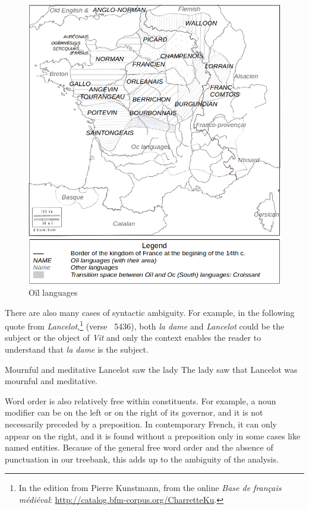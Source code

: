 \begin{figure}[thb]
    \centering
    \includegraphics[scale=0.29]{static/media/mod_eval/bertrade/map-dialects2.png}
    \caption{Oïl languages}
    \label{fig:map-dialects}
\end{figure}

There are also many cases of syntactic ambiguity. For example, in the following quote from \emph{Lancelot},\footnote{In the edition from Pierre Kunstmann, from the online \textit{Base de français médiéval}: \url{http://catalog.bfm-corpus.org/CharretteKu}.} (verse ~5436),
both \emph{la dame} and \emph{Lancelot} could be the subject or the object of \emph{Vit} and only the context enables the reader to understand that \emph{la dame} is the subject.

    {Mournful and meditative Lancelot saw the lady}
    {The lady saw that Lancelot was mournful and meditative.}

Word order is also relatively free within constituents. For example, a noun modifier can be on the left or on the right of its governor, and it is not necessarily preceded by a preposition. In contemporary French, it can only appear on the right, and it is found without a preposition only in some cases like named entities. Because of the general free word order and the absence of punctuation in our treebank, this adds up to the ambiguity of the analysis.

